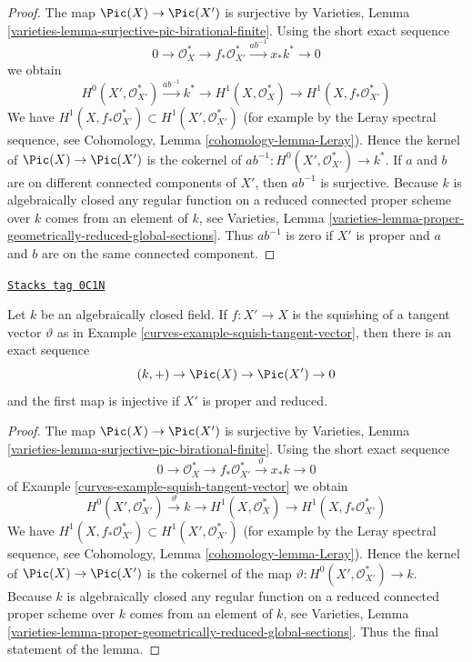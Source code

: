 \begin{proof}
The map $\Pic(X) \to \Pic(X')$ is surjective
by Varieties, Lemma \ref{varieties-lemma-surjective-pic-birational-finite}.
Using the short exact sequence
$$
0 \to \mathcal{O}_X^* \to f_*\mathcal{O}_{X'}^*
\xrightarrow{ab^{-1}} x_*k^* \to 0
$$
we obtain
$$
H^0(X', \mathcal{O}_{X'}^*) \xrightarrow{ab^{-1}} k^* \to
H^1(X, \mathcal{O}_X^*) \to H^1(X, f_*\mathcal{O}_{X'}^*)
$$
We have $H^1(X, f_*\mathcal{O}_{X'}^*) \subset H^1(X', \mathcal{O}_{X'}^*)$
(for example by the Leray spectral sequence, see
Cohomology, Lemma \ref{cohomology-lemma-Leray}).
Hence the kernel of $\Pic(X) \to \Pic(X')$ is the
cokernel of $ab^{-1} : H^0(X', \mathcal{O}_{X'}^*) \to k^*$.
If $a$ and $b$ are on different connected components of $X'$,
then $ab^{-1}$ is surjective.
Because $k$ is algebraically closed any regular function on a
reduced connected proper scheme over $k$ comes from an element of $k$, see
Varieties, Lemma
\ref{varieties-lemma-proper-geometrically-reduced-global-sections}.
Thus $ab^{-1}$ is zero if $X'$ is proper and $a$ and $b$ are on
the same connected component.
\end{proof}

\begin{lemma}
\label{curves-lemma-squish-tangent-vector}
\href{https://stacks.math.columbia.edu/tag/0C1N}{\texttt{Stacks tag 0C1N}}

Let $k$ be an algebraically closed field. If $f : X' \to X$ is the
squishing of a tangent vector $\vartheta$ as in
Example \ref{curves-example-squish-tangent-vector}, then
there is an exact sequence
$$
(k, +) \to \Pic(X) \to \Pic(X') \to 0
$$
and the first map is injective if $X'$ is proper and reduced.
\end{lemma}

\begin{proof}

The map $\Pic(X) \to \Pic(X')$ is surjective
by Varieties, Lemma \ref{varieties-lemma-surjective-pic-birational-finite}.
Using the short exact sequence
$$
0 \to \mathcal{O}_X^* \to f_*\mathcal{O}_{X'}^*
\xrightarrow{\vartheta} x_*k \to 0
$$
of Example \ref{curves-example-squish-tangent-vector} we obtain
$$
H^0(X', \mathcal{O}_{X'}^*) \xrightarrow{\vartheta} k \to
H^1(X, \mathcal{O}_X^*) \to H^1(X, f_*\mathcal{O}_{X'}^*)
$$
We have $H^1(X, f_*\mathcal{O}_{X'}^*) \subset H^1(X', \mathcal{O}_{X'}^*)$
(for example by the Leray spectral sequence, see
Cohomology, Lemma \ref{cohomology-lemma-Leray}).
Hence the kernel of $\Pic(X) \to \Pic(X')$ is the
cokernel of the map $\vartheta : H^0(X', \mathcal{O}_{X'}^*) \to k$.
Because $k$ is algebraically closed any regular function on a
reduced connected proper scheme over $k$ comes from an element of $k$, see
Varieties, Lemma
\ref{varieties-lemma-proper-geometrically-reduced-global-sections}.
Thus the final statement of the lemma.
\end{proof}

